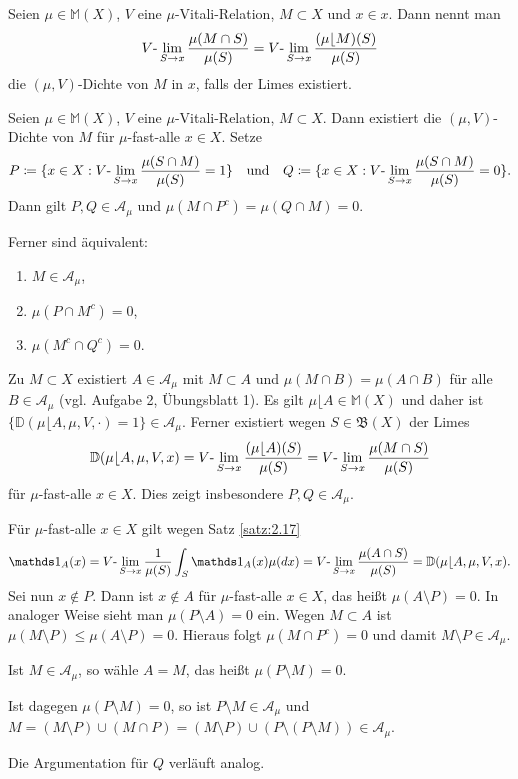 \documentclass[a4paper,twoside,DIV15,BCOR12mm]{scrbook}
\newcommand{\A}{\mathcal A}
\newcommand{\borel}{\mathfrak B}
\newcommand{\ind}{\mathds 1}
\newcommand{\MR}{\lfloor}
\begin{document}
\begin{definition}
Seien $\mu\in\mathbb M(X)$, $V$ eine $\mu$-Vitali-Relation, $M\subset X$ und $x\in x$. Dann nennt man
\[
V\text-\lim_{S\to x}\frac{\mu(M\cap S)}{\mu(S)} = V\text-\lim_{S\to x} \frac{(\mu\MR M)(S)}{\mu(S)} 
\]
die $(\mu,V)$-Dichte von $M$ in $x$, falls der Limes existiert.
\end{definition}

\begin{satz}
\label{satz:2.18}
Seien $\mu\in\mathbb M(X)$, $V$ eine $\mu$-Vitali-Relation, $M\subset X$. Dann existiert die $(\mu,V)$-Dichte 
von $M$ für $\mu$-fast-alle $x\in X$. Setze
\[
P \da \{x\in X: V\text-\lim_{S\to x}\frac{\mu(S\cap M)}{\mu(S)} = 1\} \quad\text{und}\quad
Q \da \{x\in X: V\text-\lim_{S\to x}\frac{\mu(S\cap  M)}{\mu(S)} = 0\}.
\]
Dann gilt $P,Q\in\A_\mu$ und $\mu(M\cap P^c) = \mu(Q\cap M) =0$.

Ferner sind äquivalent:
\begin{enumerate}
\item $M\in \A_\mu$,
\item $\mu(P\cap M^c) = 0$,
\item $\mu(M^c\cap Q^c) = 0$.
\end{enumerate}
\end{satz}

\begin{beweis}
Zu $M\subset X$ existiert $A\in\A_\mu$ mit $M\subset A$ und $\mu(M\cap B) = \mu(A\cap B)$ für alle $B\in\A_\mu$ 
(vgl. Aufgabe 2, Übungsblatt 1). Es gilt $\mu\MR A\in\mathbb M(X)$ und daher ist $\{\mathbb D(\mu\MR A,\mu,V,\cdot)= 1\} \in \A_\mu$. Ferner existiert wegen $S\in\borel(X)$ der Limes
\[
\mathbb D(\mu\MR A, \mu, V, x) = V\text-\lim_{S\to x} \frac{(\mu\MR A)(S)}{\mu(S)} = V\text-\lim_{S\to x}\frac{\mu(M\cap S)}{\mu(S)} 
\]
für $\mu$-fast-alle $x\in X$. Dies zeigt insbesondere $P,Q\in\A_\mu$.

Für $\mu$-fast-alle $x\in X$ gilt wegen Satz \ref{satz:2.17} 
\[
\ind_A(x)  = V\text-\lim_{S\to x} \frac1{\mu(S)} \int_S \ind_A(x) \mu(dx) = V\text-\lim_{S\to x} \frac{\mu(A\cap S)}{\mu(S)} = \mathbb D(\mu\MR A,\mu,V,x).
\]
Sei nun $x\notin P$. Dann ist $x\notin A$ für $\mu$-fast-alle $x\in X$, das heißt $\mu(A\setminus P) = 0$. In  analoger Weise sieht man $\mu(P\setminus A)=0$ ein. Wegen $M\subset A$ ist $\mu(M\setminus P) \le \mu(A\setminus P) =0$. Hieraus folgt $\mu(M\cap P^c)=0$ und damit $M\setminus P\in\A_\mu$. 

Ist $M\in\A_\mu$, so wähle $A=M$, das heißt $\mu(P\setminus M)=0$. 

Ist  dagegen $\mu(P\setminus M)=0$, so ist $P\setminus M\in\A_\mu$ und $M=(M\setminus P) \cup (M\cap P) = (M\setminus P) \cup (P\setminus (P\setminus M)) \in \A_\mu$. 

Die Argumentation für $Q$ verläuft analog.
\end{beweis}
\end{document}
